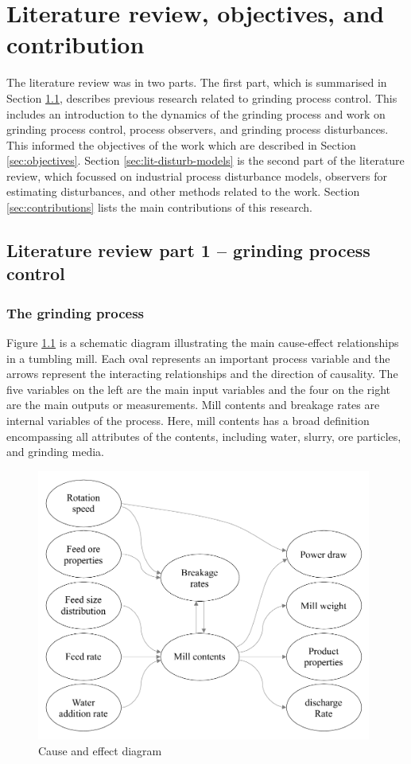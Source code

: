\chapter{Literature review, objectives, and contribution}
\label{chap-lit-review}

The literature review was in two parts. The first part, which is summarised in Section \ref{sec:lit-grinding}, describes previous research related to grinding process control. This includes an introduction to the dynamics of the grinding process and work on grinding process control, process observers, and grinding process disturbances. This informed the objectives of the work which are described in Section \ref{sec:objectives}. Section \ref{sec:lit-disturb-models} is the second part of the literature review, which focussed on industrial process disturbance models, observers for estimating disturbances, and other methods related to the work. Section \ref{sec:contributions} lists the main contributions of this research.

\section{Literature review part 1 – grinding process control} \label{sec:lit-grinding}

\subsection{The grinding process}

Figure \ref{fig:cause-effect} is a schematic diagram illustrating the main cause-effect relationships in a tumbling mill. Each oval represents an important process variable and the arrows represent the interacting relationships and the direction of causality. The five variables on the left are the main input variables and the four on the right are the main outputs or measurements. Mill contents and breakage rates are internal variables of the process. Here, mill contents has a broad definition encompassing all attributes of the contents, including water, slurry, ore particles, and grinding media.
\begin{figure}[htp]
	\centering
	\includegraphics[width=11cm]{images/cause-effect.pdf}
	\caption{Cause and effect diagram} \label{fig:cause-effect}
\end{figure}

